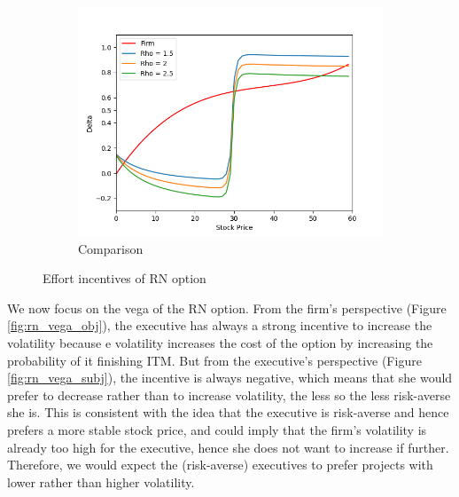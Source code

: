 \begin{figure}[H]
\begin{subfigure}{0.32\textwidth}
        \centering
        \includegraphics[width=\textwidth]{fig/4/delta_comp.png}
        \caption{Comparison}
        \label{fig:rn_delta_comp}
    \end{subfigure}
    \caption{Effort incentives of RN option}
    \label{fig:rn_delta_both}
\end{figure}
\vspace*{15pt}

We now focus on the vega of the RN option. From the firm's perspective (Figure \ref*{fig:rn_vega_obj}), the executive has always a strong incentive to increase the volatility because e volatility increases the cost of the option by increasing the probability of it finishing ITM. But from the executive's perspective (Figure \ref*{fig:rn_vega_subj}), the incentive is always negative, which means that she would prefer to decrease rather than to increase volatility, the less so the less risk-averse she is. This is consistent with the idea that the executive is risk-averse and hence prefers a more stable stock price, and could imply that the firm's volatility is already too high for the executive, hence she does not want to increase if further. Therefore, we would expect the (risk-averse) executives to prefer projects with lower rather than higher volatility.

